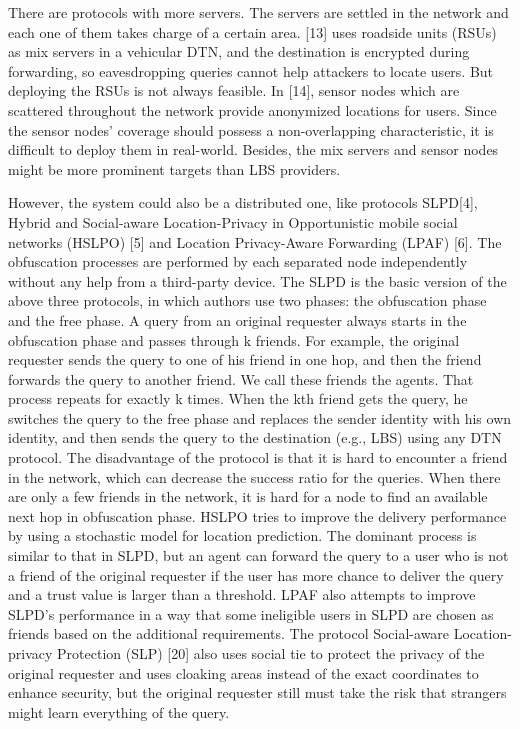 \documentclass[conference]{IEEEtran}
\begin{document}
There are protocols with more servers. The servers are settled in the network and each one of them takes charge of a certain area. [13] uses roadside units (RSUs) as mix servers in a vehicular DTN, and the destination is encrypted during forwarding, so eavesdropping queries cannot help attackers to locate users. But deploying the RSUs is not always feasible. In [14], sensor nodes which are scattered throughout the network provide anonymized locations for users. Since the sensor nodes’ coverage should possess a non-overlapping characteristic, it is difficult to deploy them in real-world. Besides, the mix servers and sensor nodes might be more prominent targets than LBS providers.

However, the system could also be a distributed one, like protocols SLPD[4], Hybrid and Social-aware Location-Privacy in Opportunistic mobile social networks (HSLPO) [5] and Location Privacy-Aware Forwarding (LPAF) [6]. The obfuscation processes are performed by each separated node independently without any help from a third-party device. The SLPD is the basic version of the above three protocols, in which authors use two phases: the obfuscation phase and the free phase. A query from an original requester always starts in the obfuscation phase and passes through k friends. For example, the original requester sends the query to one of his friend in one hop, and then the friend forwards the query to another friend. We call these friends the agents. That process repeats for exactly k times. When the kth friend gets the query, he switches the query to the free phase and replaces the sender identity with his own identity, and then sends the query to the destination (e.g., LBS) using any DTN protocol. The disadvantage of the protocol is that it is hard to encounter a friend in the network, which can decrease the success ratio for the queries. When there are only a few friends in the network, it is hard for a node to find an available next hop in obfuscation phase. HSLPO tries to improve the delivery performance by using a stochastic model for location prediction. The dominant process is similar to that in SLPD, but an agent can forward the query to a user who is not a friend of the original requester if the user has more chance to deliver the query and a trust value is larger than a threshold. LPAF also attempts to improve SLPD’s performance in a way that some ineligible users in SLPD are chosen as friends based on the additional requirements. The protocol Social-aware Location-privacy Protection (SLP) [20] also uses  social tie to protect the privacy of the original requester and uses cloaking areas instead of the exact coordinates to enhance security, but the original requester still must take the risk that strangers might learn everything of the query.
\end{document}

